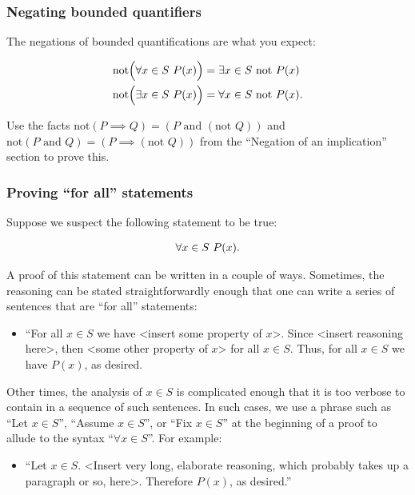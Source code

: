 \subsubsection*{Negating bounded quantifiers}

The negations of bounded quantifications are what you expect:

\begin{align*}
    &\text{not}\Big( \forall x \in S \text{ } P(x) \Big) = \exists x \in S \text{ } \text{not } P(x) \\
    &\text{not}\Big( \exists x \in S \text{ } P(x) \Big) = \forall x \in S \text{ } \text{not } P(x).
\end{align*}

Use the facts $\text{not}(P \implies Q) = (P \text{ and } (\text{not } Q))$ and $\text{not}(P \text{ and } Q) = (P \implies (\text{not } Q))$ from the ``Negation of an implication'' section to prove this.

\subsubsection*{Proving ``for all'' statements}

Suppose we suspect the following statement to be true:

\begin{align*}
    \forall x \in S \text{ } P(x).
\end{align*}

A proof of this statement can be written in a couple of ways. Sometimes, the reasoning can be stated straightforwardly enough that one can write a series of sentences that are ``for all'' statements:

\begin{itemize}
    \item ``For all $x \in S$ we have <insert some property of $x$>. Since <insert reasoning here>, then <some other property of $x$> for all $x \in S$. Thus, for all $x \in S$ we have $P(x)$, as desired.
\end{itemize}

Other times, the analysis of $x \in S$ is complicated enough that it is too verbose to contain in a sequence of such sentences. In such cases, we use a phrase such as ``Let $x \in S$'', ``Assume $x \in S$'', or ``Fix $x \in S$'' at the beginning of a proof to allude to the syntax ``$\forall x \in S$''. For example:

\begin{itemize}
    \item ``Let $x \in S$. <Insert very long, elaborate reasoning, which probably takes up a paragraph or so, here>. Therefore $P(x)$, as desired.''
\end{itemize}

